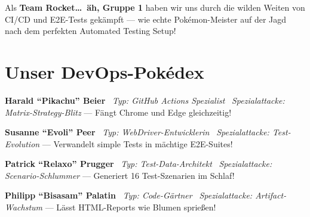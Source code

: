 \newpage
\begin{tcolorbox}[colback=pokemonyellow!10, colframe=pokemonyellow!50, title=Hallo Kevin!]
Als \textbf{Team Rocket\ldots\ äh, Gruppe 1} haben wir uns durch die wilden Weiten von CI/CD und E2E-Tests gekämpft --- wie echte Pokémon-Meister auf der Jagd nach dem perfekten Automated Testing Setup!
\end{tcolorbox}
\section{Unser DevOps-Pokédex}
\begin{tcolorbox}[colback=pokemonyellow!5, colframe=pokemonyellow!30]
\textbf{Harald ``Pikachu'' Beier} \
\textit{Typ: GitHub Actions Spezialist} \
\textit{Spezialattacke: Matrix-Strategy-Blitz} --- Fängt Chrome und Edge gleichzeitig!
\end{tcolorbox}
\begin{tcolorbox}[colback=pokemongreen!5, colframe=pokemongreen!30]
\textbf{Susanne ``Evoli'' Peer} \
\textit{Typ: WebDriver-Entwicklerin} \
\textit{Spezialattacke: Test-Evolution} --- Verwandelt simple Tests in mächtige E2E-Suites!
\end{tcolorbox}
\begin{tcolorbox}[colback=pokemonblue!5, colframe=pokemonblue!30]
\textbf{Patrick ``Relaxo'' Prugger}  \
\textit{Typ: Test-Data-Architekt} \
\textit{Spezialattacke: Scenario-Schlummer} --- Generiert 16 Test-Szenarien im Schlaf!
\end{tcolorbox}
\begin{tcolorbox}[colback=pokemongreen!5, colframe=pokemongreen!30]
\textbf{Philipp ``Bisasam'' Palatin} \
\textit{Typ: Code-Gärtner} \
\textit{Spezialattacke: Artifact-Wachstum} --- Lässt HTML-Reports wie Blumen sprießen!
\end{tcolorbox}
